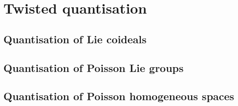 \section{Twisted quantisation}
    \subsection{Quantisation of Lie coideals}

    \subsection{Quantisation of Poisson Lie groups}

    \subsection{Quantisation of Poisson homogeneous spaces}